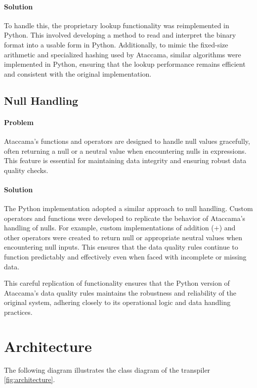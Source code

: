 \paragraph{Solution}

To handle this, the proprietary lookup functionality was reimplemented in Python. This involved developing a method to read and interpret the binary format into a usable form in Python. Additionally, to mimic the fixed-size arithmetic and specialized hashing used by Ataccama, similar algorithms were implemented in Python, ensuring that the lookup performance remains efficient and consistent with the original implementation.
\subsection{Null Handling}
\paragraph{Problem}

Ataccama's functions and operators are designed to handle null values gracefully, often returning a null or a neutral value when encountering nulls in expressions. This feature is essential for maintaining data integrity and ensuring robust data quality checks.
\paragraph{Solution}

The Python implementation adopted a similar approach to null handling. Custom operators and functions were developed to replicate the behavior of Ataccama's handling of nulls. For example, custom implementations of addition (+) and other operators were created to return null or appropriate neutral values when encountering null inputs. This ensures that the data quality rules continue to function predictably and effectively even when faced with incomplete or missing data.

This careful replication of functionality ensures that the Python version of Ataccama's data quality rules maintains the robustness and reliability of the original system, adhering closely to its operational logic and data handling practices.

\section{Architecture}

The following diagram illustrates the class diagram of the transpiler \ref{fig:architecture}.


